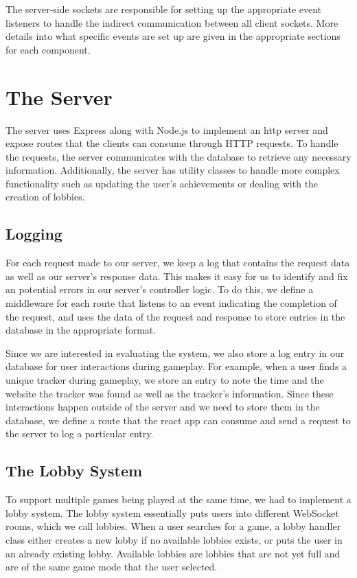\documentclass{l4proj}
\begin{document}
The server-side sockets are responsible for setting up the appropriate event listeners to handle the indirect communication between all client sockets. More details into what specific events are set up are given in the appropriate sections for each component.

\section{The Server}
The server uses Express along with Node.js to implement an http server and expose routes that the clients can consume through HTTP requests. To handle the requests, the server communicates with the database to retrieve any necessary information. Additionally, the server has utility classes to handle more complex functionality such as updating the user's achievements or dealing with the creation of lobbies. 

\subsection{Logging}
For each request made to our server, we keep a log that contains the request data as well as our server's response data. This makes it easy for us to identify and fix an potential errors in our server's controller logic. To do this, we define a middleware for each route that listens to an event indicating the completion of the request, and uses the data of the request and response to store entries in the database in the appropriate format.

Since we are interested in evaluating the system, we also store a log entry in our database for user interactions during gameplay. For example, when a user finds a unique tracker during gameplay, we store an entry to note the time and the website the tracker was found as well as the tracker's information. Since these interactions happen outside of the server and we need to store them in the database, we define a route that the react app can consume and send a request to the server to log a particular entry.

\subsection{The Lobby System}
To support multiple games being played at the same time, we had to implement a lobby system. The lobby system essentially puts users into different WebSocket rooms, which we call lobbies. When a user searches for a game, a lobby handler class either creates a new lobby if no available lobbies exists, or puts the user in an already existing lobby. Available lobbies are lobbies that are not yet full and are of the same game mode that the user selected. 
\end{document}
